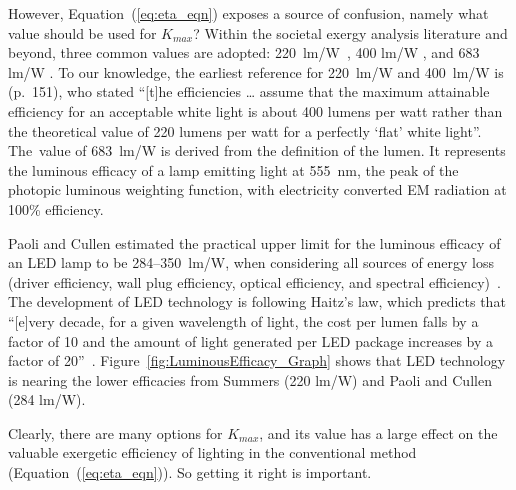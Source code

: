 \documentclass[energies,article,accept,moreauthors,pdftex]{Definitions/mdpi}\usepackage[]{graphicx}\usepackage[]{color}
\newcommand{\del}[1]{}
\newcommand{\ins}[1]{#1}
\newcommand{\rev}[2]{#2}
\providecommand{\DIFdelbegin}{} %
\providecommand{\DIFdelend}{} %
\newcommand{\DIFscaledelfig}{0.5}
\newlength{\DIFdelgraphicswidth} %
\newlength{\DIFdelgraphicsheight} %
\newcommand{\DIFdelincludegraphics}[2][]{%
\sbox{\DIFdelgraphicsbox}{\DIFOincludegraphics[#1]{#2}}%
\settoboxwidth{\DIFdelgraphicswidth}{\DIFdelgraphicsbox} %
\settoboxtotalheight{\DIFdelgraphicsheight}{\DIFdelgraphicsbox} %
\scalebox{\DIFscaledelfig}{%
\parbox[b]{\DIFdelgraphicswidth}{\usebox{\DIFdelgraphicsbox}\\[-\baselineskip] \rule{\DIFdelgraphicswidth}{0em}}\llap{\resizebox{\DIFdelgraphicswidth}{\DIFdelgraphicsheight}{%
\setlength{\unitlength}{\DIFdelgraphicswidth}%
\begin{picture}(1,1)%
\thicklines\linethickness{2pt} %
{\color[rgb]{1,0,0}\put(0,0){\framebox(1,1){}}}%
{\color[rgb]{1,0,0}\put(0,0){\line( 1,1){1}}}%
{\color[rgb]{1,0,0}\put(0,1){\line(1,-1){1}}}%
\end{picture}%
}\hspace*{3pt}}} %
} %
\DeclareRobustCommand{\DIFdelbegin}{\DIFOdelbegin \let\includegraphics\DIFdelincludegraphics} %
\DeclareRobustCommand{\DIFdelend}{\DIFOaddend \let\includegraphics\DIFOincludegraphics} %
\begin{document}
However, Equation~(\ref{eq:eta_eqn}) exposes 
a source of confusion, 
namely what value should be used for $K_{max}$?
Within the societal exergy analysis literature and beyond, 
three common values are adopted: 
\mbox{220~lm/W \cite{Summers1971, Ayres2003, USDepartmentofEnergyDoE2011}},
400 lm/W \cite{Summers1971, Ayres2005, Tsao2010solidstate, Guevara:2016a}, and
683 lm/W \cite{Kondo2009, Serrenho2014}.
To our knowledge, 
the earliest reference for 220~lm/W and 400~lm/W is 
\citet{Summers1971} (p.~151),
who stated ``[t]he efficiencies \ldots{} assume that the maximum attainable efficiency
for an acceptable white light is about
400 lumens per watt rather than the theoretical value 
of 220 lumens per watt 
for a perfectly `flat' white light''.
\mbox{The value} of 683~lm/W is  %
derived from the definition of the lumen. 
It represents the luminous efficacy of a lamp 
emitting light at 555~nm, the peak of the photopic luminous weighting function, 
with electricity converted EM radiation at 100\% efficiency.


Paoli and Cullen
estimated the practical upper limit for the luminous efficacy of an LED lamp to be 284--350~lm/W,
when considering all  %
sources  of energy loss
\DIFdelbegin %
(driver efficiency, wall plug efficiency, optical efficiency, and spectral efficiency)~\citep{Paoli2020}.
The development of LED technology is following Haitz's law, 
which predicts that ``[e]very decade, for a given wavelength of light, 
the cost per lumen falls by a factor of 10 
and the amount of light generated per LED package increases 
by a factor of 20''~\citep{haitz1999case, graydon2007haitz}.
Figure~\ref{fig:LuminousEfficacy_Graph} shows that 
LED technology is nearing  the 
lower efficacies from Summers (220 lm/W) and
Paoli and Cullen (284 lm/W).
\DIFdelbegin %
\DIFdelend 

Clearly, there are many options for $K_{max}$, and
its value has a large effect on the valuable exergetic efficiency of lighting
in the conventional method (Equation~(\ref{eq:eta_eqn})).
So getting it right is important.
\end{document}
